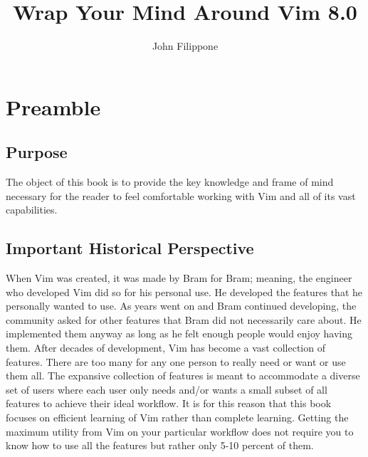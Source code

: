 \documentclass[12pt, oneside]{book}
\title{Wrap Your Mind Around Vim 8.0}
\author{John Filippone}
\begin{document}
\maketitle
\tableofcontents

\chapter{Preamble}
\section{Purpose}
The object of this book is to provide the key knowledge and frame of mind necessary for the reader to feel comfortable working with Vim and all of its vast capabilities.

\section{Important Historical Perspective}
When Vim was created, it was made by Bram for Bram; meaning, the engineer who developed Vim did so for his personal use.  He developed the features that he personally wanted to use.  As years went on and Bram continued developing, the community asked for other features that Bram did not necessarily care about.  He implemented them anyway as long as he felt enough people would enjoy having them.  After decades of development, Vim has become a vast collection of features.  There are too many for any one person to really need or want or use them all.  The expansive collection of features is meant to accommodate a diverse set of users where each user only needs and/or wants a small subset of all features to achieve their ideal workflow.  It is for this reason that this book focuses on efficient learning of Vim rather than complete learning.  Getting the maximum utility from Vim on your particular workflow does not require you to know how to use all the features but rather only 5-10 percent of them.
\end{document}
